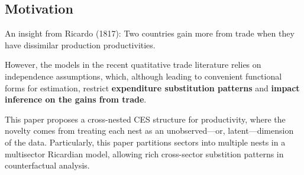 \subsection{Motivation}
An insight from Ricardo (1817):
Two countries gain more from trade when they have dissimilar production productivities.

However, the models in the recent quatitative trade literature relies on independence assumptions,
which, although leading to convenient functional forms for estimation,
restrict \textbf{expenditure substitution patterns} and 
\textbf{impact inference on the gains from trade}.

This paper proposes a cross-nested CES structure for productivity, 
where the novelty comes from treating each nest as an unobserved—or, latent—dimension of the data.
Particularly, this paper partitions sectors into multiple nests in a multisector Ricardian model,
allowing rich cross-sector substition patterns in counterfactual analysis.

